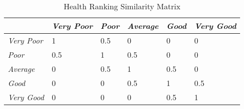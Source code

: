 \begin{table}[ht]
  \begin{center}
    \caption{Health Ranking Similarity Matrix}
    \label{tab:SimilarityMatrix}
    \begin{tabular}{|l|l|l|l|l|l|} %
      \hline
      \hspace{1cm}       & \textit{Very Poor} & \textit{Poor} & \textit{Average} & \textit{Good} & \textit{Very Good} \\
      \hline
      \textit{Very Poor} & 1                  & 0.5           & 0                & 0             & 0                  \\
      \hline
      \textit{Poor}      & 0.5                & 1             & 0.5              & 0             & 0                  \\
      \hline
      \textit{Average}   & 0                  & 0.5           & 1                & 0.5           & 0                  \\
      \hline
      \textit{Good}      & 0                  & 0             & 0.5              & 1             & 0.5                \\
      \hline
      \textit{Very Good} & 0                  & 0             & 0                & 0.5           & 1                  \\
      \hline
    \end{tabular}
  \end{center}
\end{table}

